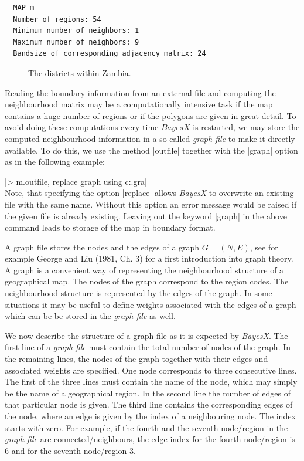 \documentclass[a4paper]{article}
\begin{document}
\begin{verbatim}
  MAP m
  Number of regions: 54
  Minimum number of neighbors: 1
  Maximum number of neighbors: 9
  Bandsize of corresponding adjacency matrix: 24
\end{verbatim}

\begin{figure}[ht]
\begin{center}
 {\it\caption{The
districts within Zambia.\label{zambiamap}}}
\end{center}
\end{figure}

Reading the boundary information from an external file and
computing the neighbourhood matrix may be a computationally
intensive task if the map contains a huge number of regions or if
the polygons are given in great detail. To avoid doing these
computations every time $BayesX$ is restarted, we may store the
computed neighbourhood information in a so-called {\it graph file}
to make it directly available. To do this, we use the method
|outfile| together with the |graph| option as in the following
example:

|> m.outfile, replace graph using c:\data\zambia.gra|\\

Note, that specifying the option |replace| allows {\it BayesX} to
overwrite an existing file with the same name. Without this option
an error message would be raised if the given file is already
existing. Leaving out the keyword |graph| in the above command
leads to storage of the map in boundary format.

A graph file stores the nodes and the edges of a graph $G =
(N,E)$, see for example George and Liu (1981, Ch. 3) for a first
introduction into graph theory. A graph is a convenient way of
representing the neighbourhood structure of a geographical map.
The nodes of the graph correspond to the region codes. The
neighbourhood structure is represented by the edges of the graph.
In some situations it may be useful to define weights associated
with the edges of a graph which can be be stored in the {\em graph
file} as well.

We now describe the structure of a graph file as it is expected by
{\em BayesX}. The first line of a {\em graph file} must contain
the total number of nodes of the graph. In the remaining lines,
the nodes of the graph together with their edges and associated
weights are specified. One node corresponds to three consecutive
lines. The first of the three lines must contain the name of the
node, which may simply be the name of a geographical region. In
the second line the number of edges of that particular node is
given. The third line contains the corresponding edges of the
node, where an edge is given by the index of a neighbouring node.
The index starts with zero. For example, if the fourth and the
seventh node/region in the {\em graph file} are
connected/neighbours, the edge index for the fourth node/region is
6 and for the seventh node/region 3.
\end{document}
